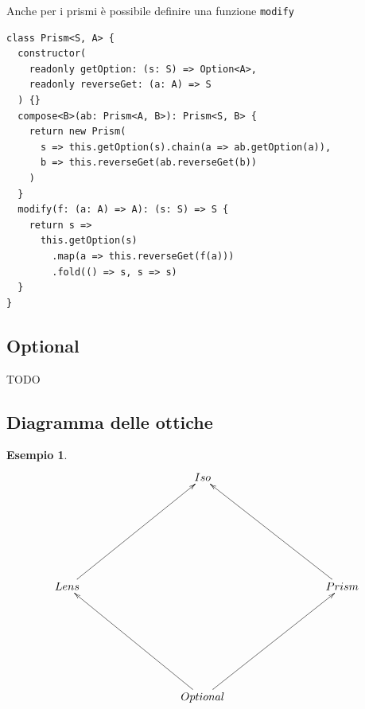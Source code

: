 \documentclass[12pt]{article}
\newtheorem{example}{Esempio}[section]
\begin{document}
Anche per i prismi è possibile definire una funzione \texttt{modify}

\begin{verbatim}
class Prism<S, A> {
  constructor(
    readonly getOption: (s: S) => Option<A>,
    readonly reverseGet: (a: A) => S
  ) {}
  compose<B>(ab: Prism<A, B>): Prism<S, B> {
    return new Prism(
      s => this.getOption(s).chain(a => ab.getOption(a)),
      b => this.reverseGet(ab.reverseGet(b))
    )
  }
  modify(f: (a: A) => A): (s: S) => S {
    return s =>
      this.getOption(s)
        .map(a => this.reverseGet(f(a)))
        .fold(() => s, s => s)
  }
}
\end{verbatim}

\subsection{Optional}

TODO

\subsection{Diagramma delle ottiche}

\begin{example}
\[
\xymatrixrowsep{3cm}
\xymatrixcolsep{3cm}
\xymatrix{
  & Iso \\
  Lens \ar[ur] & & Prism \ar[ul] \\
  & Optional \ar[ul] \ar[ur] \\
}
\]
\end{example}
\end{document}
